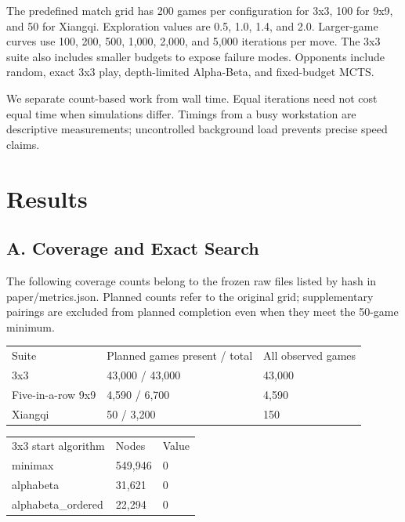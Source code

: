 \documentclass[conference]{IEEEtran}
\begin{document}
The predefined match grid has 200 games per configuration for 3x3, 100 for 9x9, and 50 for Xiangqi. Exploration values are 0.5, 1.0, 1.4, and 2.0. Larger-game curves use 100, 200, 500, 1,000, 2,000, and 5,000 iterations per move. The 3x3 suite also includes smaller budgets to expose failure modes. Opponents include random, exact 3x3 play, depth-limited Alpha-Beta, and fixed-budget MCTS.


We separate count-based work from wall time. Equal iterations need not cost equal time when simulations differ. Timings from a busy workstation are descriptive measurements; uncontrolled background load prevents precise speed claims.


\section{Results}

\subsection{A. Coverage and Exact Search}

The following coverage counts belong to the frozen raw files listed by hash in paper/metrics.json. Planned counts refer to the original grid; supplementary pairings are excluded from planned completion even when they meet the 50-game minimum.


\begin{center}\scriptsize\begin{tabular}{lll}\hline
Suite & Planned games present / total & All observed games \\
3x3 & 43,000 / 43,000 & 43,000 \\
Five-in-a-row 9x9 & 4,590 / 6,700 & 4,590 \\
Xiangqi & 50 / 3,200 & 150 \\
\hline\end{tabular}\end{center}

\begin{center}\scriptsize\begin{tabular}{lll}\hline
3x3 start algorithm & Nodes & Value \\
minimax & 549,946 & 0 \\
alphabeta & 31,621 & 0 \\
alphabeta\_ordered & 22,294 & 0 \\
\hline\end{tabular}\end{center}
\end{document}

